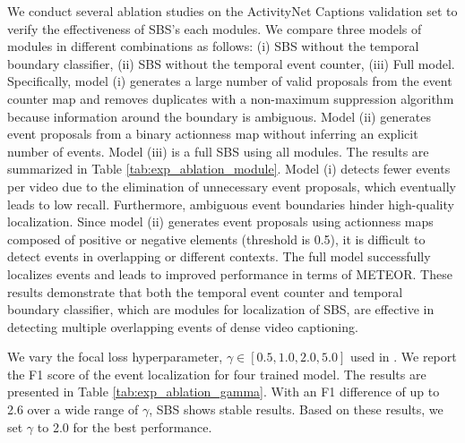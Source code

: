We conduct several ablation studies on the ActivityNet Captions validation set to verify the effectiveness of SBS's each modules.
We compare three models of modules in different combinations as follows: (i) SBS without the temporal boundary classifier, (ii) SBS without the temporal event counter, (iii) Full model.
Specifically, model (i) generates a large number of valid proposals from the event counter map and removes duplicates with a non-maximum suppression algorithm because information around the boundary is ambiguous.
Model (ii) generates event proposals from a binary actionness map without inferring an explicit number of events.
Model (iii) is a full SBS using all modules.
The results are summarized in Table \ref{tab:exp_ablation_module}.
Model (i) detects fewer events per video due to the elimination of unnecessary event proposals, which eventually leads to low recall.
Furthermore, ambiguous event boundaries hinder high-quality localization.
Since model (ii) generates event proposals using actionness maps composed of positive or negative elements (threshold is 0.5), it is difficult to detect events in overlapping or different contexts.
The full model successfully localizes events and leads to improved performance in terms of METEOR.
These results demonstrate that both the temporal event counter and temporal boundary classifier, which are modules for localization of SBS, are effective in detecting multiple overlapping events of dense video captioning.

We vary the focal loss hyperparameter, $\gamma \in \left[0.5, 1.0, 2.0, 5.0\right]$ used in \cite{lin2017focal}.
We report the F1 score of the event localization for four trained model.
The results are presented in Table \ref{tab:exp_ablation_gamma}.
With an F1 difference of up to 2.6 over a wide range of $\gamma$, SBS shows stable results.
Based on these results, we set $\gamma$ to 2.0 for the best performance.